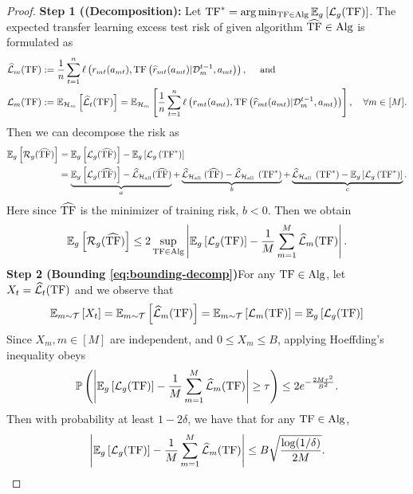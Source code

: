 \begin{proof}
\textbf{Step 1 (\textbf{(Decomposition)}:} Let $\mathrm{TF}^*=\arg \min _{\mathrm{TF} \in \mathrm{Alg}} \mathbb{E}_{g}\left[\mathcal{L}_{g}(\mathrm{TF})\right]$. The expected transfer learning excess test risk of given algorithm $\widehat{\mathrm{TF}} \in \mathrm{Alg}$ is formulated as
\begin{align*}
& \widehat{\mathcal{L}}_m(\mathrm{TF}):=\frac{1}{n} \sum_{t=1}^n \ell\left(r_{m t}(a_{mt}), \mathrm{TF}\left(\widehat{r}_{m t}(a_{mt})| \mathcal{D}_m^{t-1}, a_{m t}\right)\right), \quad \text { and } \\
& \mathcal{L}_m(\mathrm{TF}):=\mathbb{E}_{\mathcal{H}_m}\left[\widehat{\mathcal{L}}_t(\mathrm{TF})\right]=\mathbb{E}_{\mathcal{H}_m}\left[\frac{1}{n} \sum_{t=1}^n \ell\left(r_{m t}(a_{mt}), \mathrm{TF}\left(\widehat{r}_{m t}(a_{mt})| \mathcal{D}_m^{t-1}, a_{m t}\right)\right)\right], \quad \forall m \in[M] .
\end{align*}
Then we can decompose the risk as 
\begin{align*}
\mathbb{E}_{g}\left[\mathcal{R}_{g}(\widehat{\mathrm{TF}})\right] &=\mathbb{E}_{g}\left[\mathcal{L}_{g}(\widehat{\mathrm{TF}})\right]-\mathbb{E}_{g}\left[\mathcal{L}_{g}\left(\mathrm{TF}^*\right)\right]\\
& = 
\underbrace{\mathbb{E}_{g}\left[\mathcal{L}_{g}(\widehat{\mathrm{TF}})\right]-\widehat{\mathcal{L}}_{\mathcal{H}_{\mathrm{all}}}(\widehat{\mathrm{TF}})}_a + \underbrace{\widehat{\mathcal{L}}_{\mathcal{H}_{\text {all }}}(\widehat{\mathrm{TF}})-\widehat{\mathcal{L}}_{\mathcal{H}_{\text {all }}}\left(\mathrm{TF}^*\right)}_b +\underbrace{\widehat{\mathcal{L}}_{\mathcal{H}_{\text {all }}}\left(\mathrm{TF}^*\right)-\mathbb{E}_{g}\left[\mathcal{L}_{g}\left(\mathrm{TF}^*\right)\right]}_c .
\end{align*}
Here since $\widehat{\mathrm{TF}}$ is the minimizer of training risk, $b<0$. Then we obtain
\begin{align}
\mathbb{E}_{g}\left[\mathcal{R}_{g}(\widehat{\mathrm{TF}})\right] \leq 2 \sup _{\mathrm{TF} \in \mathrm{Alg}}\left|\mathbb{E}_{g}\left[\mathcal{L}_{g}(\mathrm{TF})\right]-\frac{1}{M} \sum_{m=1}^M \widehat{\mathcal{L}}_m(\mathrm{TF})\right| .\label{eq:bounding-decomp}
\end{align}
\textbf{Step 2 (Bounding \eqref{eq:bounding-decomp})}For any $\mathrm{TF} \in \mathrm{Alg}$, let $X_t=\widehat{\mathcal{L}}_t(\mathrm{TF})$ and we observe that
\begin{align*}
\mathbb{E}_{m \sim \mathcal{T}}\left[X_t\right]=\mathbb{E}_{m \sim \mathcal{T}}\left[\widehat{\mathcal{L}}_m(\mathrm{TF})\right]=\mathbb{E}_{m \sim \mathcal{T}}\left[\mathcal{L}_m(\mathrm{TF})\right]=\mathbb{E}_{g}\left[\mathcal{L}_{g}(\mathrm{TF})\right]
\end{align*}
Since $X_m, m \in[M]$ are independent, and $0 \leq X_m \leq B$, applying Hoeffding's inequality obeys
\begin{align*}
\mathbb{P}\left(\left|\mathbb{E}_{g}\left[\mathcal{L}_{g}(\mathrm{TF})\right]-\frac{1}{M} \sum_{m=1}^M \widehat{\mathcal{L}}_m(\mathrm{TF})\right| \geq \tau\right) \leq 2 e^{-\frac{2 M \tau^2}{B^2}} .
\end{align*}
%
Then with probability at least $1-2 \delta$, we have that for any $\mathrm{TF} \in \mathrm{Alg}$,
\begin{align}
\left|\mathbb{E}_{g}\left[\mathcal{L}_{g}(\mathrm{TF})\right]-\frac{1}{M} \sum_{m=1}^M \widehat{\mathcal{L}}_m(\mathrm{TF})\right| \leq B \sqrt{\frac{\log (1 / \delta)}{2 M}} . \label{eq:decomp-1}
\end{align}



\end{proof}
